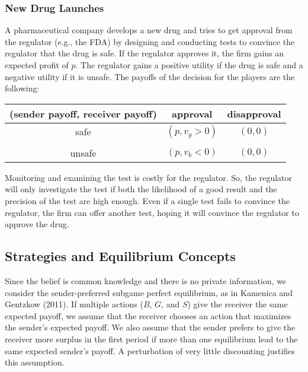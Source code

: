 \documentclass[11pt]{extarticle}
\begin{document}
\subsubsection{New Drug Launches}
A pharmaceutical company develops a new drug and tries to get approval from the regulator (e.g., the FDA) by designing and conducting tests to convince the regulator that the drug is safe. If the regulator approves it, the firm gains an expected profit of $p$. The regulator gains a positive utility if the drug is safe and a negative utility if it is unsafe. The payoffs of the decision for the players are the following:
\begin{table}[H] \centering 
	\small
	\begin{tabular}{c c c}
		\\
		\hline
		(sender payoff, receiver payoff)& approval & disapproval \\
		\hline
		safe & $(p,v_g > 0)$ & $(0,0)$  \\
		&&\\
		unsafe &$(p,v_b < 0)$ & $(0,0)$ \\
		\hline
	\end{tabular}
\end{table}
Monitoring and examining the test is costly for the regulator. So, the regulator will only investigate the test if both the likelihood of a good result  and the precision of the test are high enough. Even if a single test fails to convince the regulator, the firm can offer another test, hoping it will convince the regulator to approve the drug.



\subsection{Strategies and Equilibrium Concepts}\label{secstrategy}
Since the belief is common knowledge and there is no private information, we consider the sender-preferred subgame perfect equilibrium, as in Kamenica and Gentzkow (2011). If multiple actions ($B$, $G$, and $S$) give the receiver the same expected payoff, we assume that the receiver chooses an action that maximizes the sender's expected payoff. We also assume that the sender prefers to give the receiver more surplus in the first period if more than one equilibrium lead to the same expected sender's payoff. A perturbation of very little discounting justifies this assumption. 
\end{document}
